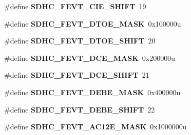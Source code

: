\begin{DoxyCompactItemize}
\item 
\#define {\bfseries S\+D\+H\+C\+\_\+\+F\+E\+V\+T\+\_\+\+C\+I\+E\+\_\+\+S\+H\+I\+FT}~19\hypertarget{group__SDHC__Register__Masks_ga86ac6629356f3a89fbd8c06167abfac9}{}\label{group__SDHC__Register__Masks_ga86ac6629356f3a89fbd8c06167abfac9}

\item 
\#define {\bfseries S\+D\+H\+C\+\_\+\+F\+E\+V\+T\+\_\+\+D\+T\+O\+E\+\_\+\+M\+A\+SK}~0x100000u\hypertarget{group__SDHC__Register__Masks_ga6c5de59c47a6627c08013e5e5af04943}{}\label{group__SDHC__Register__Masks_ga6c5de59c47a6627c08013e5e5af04943}

\item 
\#define {\bfseries S\+D\+H\+C\+\_\+\+F\+E\+V\+T\+\_\+\+D\+T\+O\+E\+\_\+\+S\+H\+I\+FT}~20\hypertarget{group__SDHC__Register__Masks_gad96cef6ac842de516e11f7e9e519408f}{}\label{group__SDHC__Register__Masks_gad96cef6ac842de516e11f7e9e519408f}

\item 
\#define {\bfseries S\+D\+H\+C\+\_\+\+F\+E\+V\+T\+\_\+\+D\+C\+E\+\_\+\+M\+A\+SK}~0x200000u\hypertarget{group__SDHC__Register__Masks_ga544e27b3392401737744fa5a291685e3}{}\label{group__SDHC__Register__Masks_ga544e27b3392401737744fa5a291685e3}

\item 
\#define {\bfseries S\+D\+H\+C\+\_\+\+F\+E\+V\+T\+\_\+\+D\+C\+E\+\_\+\+S\+H\+I\+FT}~21\hypertarget{group__SDHC__Register__Masks_gaa4f8f70316d6254d3c69c4a0d767646e}{}\label{group__SDHC__Register__Masks_gaa4f8f70316d6254d3c69c4a0d767646e}

\item 
\#define {\bfseries S\+D\+H\+C\+\_\+\+F\+E\+V\+T\+\_\+\+D\+E\+B\+E\+\_\+\+M\+A\+SK}~0x400000u\hypertarget{group__SDHC__Register__Masks_gac409de67d8fb1f25c2d250922180f666}{}\label{group__SDHC__Register__Masks_gac409de67d8fb1f25c2d250922180f666}

\item 
\#define {\bfseries S\+D\+H\+C\+\_\+\+F\+E\+V\+T\+\_\+\+D\+E\+B\+E\+\_\+\+S\+H\+I\+FT}~22\hypertarget{group__SDHC__Register__Masks_ga2524f7345007e20b9788e9b83874c225}{}\label{group__SDHC__Register__Masks_ga2524f7345007e20b9788e9b83874c225}

\item 
\#define {\bfseries S\+D\+H\+C\+\_\+\+F\+E\+V\+T\+\_\+\+A\+C12\+E\+\_\+\+M\+A\+SK}~0x1000000u\hypertarget{group__SDHC__Register__Masks_gadbf12dd087ee8570d4d9efd31f565bc9}{}\label{group__SDHC__Register__Masks_gadbf12dd087ee8570d4d9efd31f565bc9}


\end{DoxyCompactItemize}

